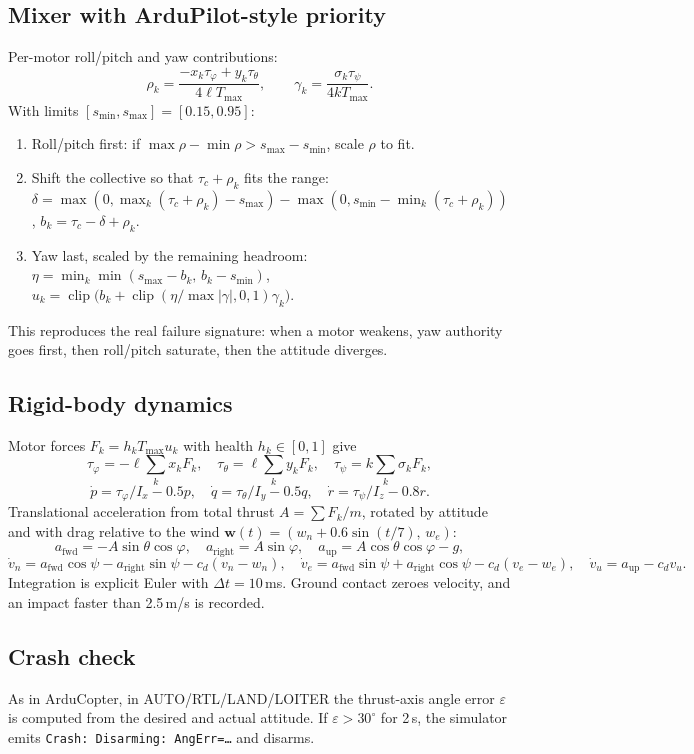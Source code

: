\documentclass[11pt,a4paper]{article}
\newcommand{\code}[1]{\texttt{#1}}
\begin{document}
\subsection{Mixer with ArduPilot-style priority}
Per-motor roll/pitch and yaw contributions:
\[
\rho_k=\frac{-x_k\tau_\varphi+y_k\tau_\theta}{4\ell T_{\max}},\qquad
\gamma_k=\frac{\sigma_k\tau_\psi}{4kT_{\max}} .
\]
With limits $[s_{\min},s_{\max}]=[0.15,0.95]$:
\begin{enumerate}
  \item Roll/pitch first: if $\max\rho-\min\rho>s_{\max}-s_{\min}$, scale $\rho$ to fit.
  \item Shift the collective so that $\tau_c+\rho_k$ fits the range:
        $\delta=\max(0,\max_k(\tau_c+\rho_k)-s_{\max})-\max(0,s_{\min}-\min_k(\tau_c+\rho_k))$,
        $b_k=\tau_c-\delta+\rho_k$.
  \item Yaw last, scaled by the remaining headroom:
        $\eta=\min_k\min(s_{\max}-b_k,\,b_k-s_{\min})$,
        $u_k=\operatorname{clip}\bigl(b_k+\operatorname{clip}(\eta/\max|\gamma|,0,1)\gamma_k\bigr)$.
\end{enumerate}
This reproduces the real failure signature: when a motor weakens, yaw authority goes first,
then roll/pitch saturate, then the attitude diverges.

\subsection{Rigid-body dynamics}
Motor forces $F_k=h_kT_{\max}u_k$ with health $h_k\in[0,1]$ give
\[
\tau_\varphi=-\ell\sum_kx_kF_k,\quad
\tau_\theta=\ell\sum_ky_kF_k,\quad
\tau_\psi=k\sum_k\sigma_kF_k,
\]
\[
\dot p=\tau_\varphi/I_x-0.5p,\quad \dot q=\tau_\theta/I_y-0.5q,\quad \dot r=\tau_\psi/I_z-0.8r .
\]
Translational acceleration from total thrust $A=\sum F_k/m$, rotated by attitude and with drag
relative to the wind $\mathbf w(t)=(w_n+0.6\sin(t/7),\,w_e)$:
\[
a_{\text{fwd}}=-A\sin\theta\cos\varphi,\quad a_{\text{right}}=A\sin\varphi,\quad
a_{\text{up}}=A\cos\theta\cos\varphi-g,
\]
\[
\dot v_n=a_{\text{fwd}}\cos\psi-a_{\text{right}}\sin\psi-c_d(v_n-w_n),\quad
\dot v_e=a_{\text{fwd}}\sin\psi+a_{\text{right}}\cos\psi-c_d(v_e-w_e),\quad
\dot v_u=a_{\text{up}}-c_dv_u .
\]
Integration is explicit Euler with $\Delta t=10$\,ms. Ground contact zeroes velocity, and an
impact faster than 2.5\,m/s is recorded.

\subsection{Crash check}
As in ArduCopter, in AUTO/RTL/LAND/LOITER the thrust-axis angle error $\varepsilon$ is computed
from the desired and actual attitude. If $\varepsilon>30^\circ$ for 2\,s, the simulator emits
\code{Crash: Disarming: AngErr=\ldots} and disarms.
\end{document}
